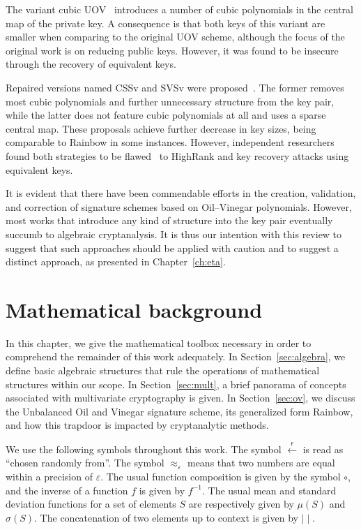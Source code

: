 \documentclass[12pt, a4paper, oneside]{memoir}
\newcommand{\random}{\overset{\mathsf{r}}{\gets}}
\theoremstyle{definition}
\begin{document}
The variant cubic UOV~\cite{Nie:201511} introduces a number of cubic polynomials in the central map of the private key. A consequence is that both keys of this variant are smaller when comparing to the original UOV scheme, although the focus of the original work is on reducing public keys. However, it was found to be insecure~\cite{Hashimoto:201712} through the recovery of equivalent keys. 

Repaired versions named CSSv and SVSv were proposed~\cite{Duong:201611}. The former removes most cubic polynomials and further unnecessary structure from the key pair, while the latter does not feature cubic polynomials at all and uses a sparse central map. These proposals achieve further decrease in key sizes, being comparable to Rainbow in some instances. However, independent researchers found both strategies to be flawed~\cite{Shim:201711,Hashimoto:201712} to HighRank and key recovery attacks using equivalent keys.

It is evident that there have been commendable efforts in the creation, validation, and correction of signature schemes based on Oil--Vinegar polynomials. However, most works that introduce any kind of structure into the key pair eventually succumb to algebraic cryptanalysis. It is thus our intention with this review to suggest that such approaches should be applied with caution and to suggest a distinct approach, as presented in Chapter~\ref{ch:eta}.

\chapter{Mathematical background}\label{ch:math}

In this chapter, we give the mathematical toolbox necessary in order to comprehend the remainder of this work adequately. In Section~\ref{sec:algebra}, we define basic algebraic structures that rule the operations of mathematical structures within our scope. In Section~\ref{sec:mult}, a brief panorama of concepts associated with multivariate cryptography is given. In Section~\ref{sec:ov}, we discuss the Unbalanced Oil and Vinegar signature scheme, its generalized form Rainbow, and how this trapdoor is impacted by cryptanalytic methods.

We use the following symbols throughout this work. The symbol $\random$ is read as ``chosen randomly from''. The symbol $\approx_{\varepsilon}$ means that two numbers are equal within a precision of $\varepsilon$. The usual function composition is given by the symbol $\circ$, and the inverse of a function $f$ is given by $f^{-1}$. The usual mean and standard deviation functions for a set of elements $S$ are respectively given by $\mu(S)$ and $\sigma(S)$. The concatenation of two elements up to context is given by $\mid\mid$.
\end{document}
